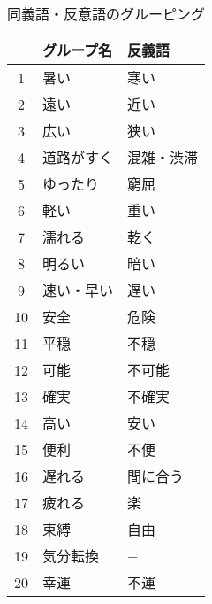 \documentclass[japanese]{jnlp_1.3a}
\begin{document}
\begin{table}[b]
  \caption{同義語・反意語のグルーピング}
  \begin{center}
    \begin{tabular}{|c|l|l|} \hline
          & グループ名     & 反義語     \\ \hline
       1  & 暑い           & 寒い       \\
       2  & 遠い           & 近い       \\
       3  & 広い           & 狭い       \\
       4  & 道路がすく     & 混雑・渋滞 \\
       5  & ゆったり       & 窮屈       \\
       6  & 軽い           & 重い       \\
       7  & 濡れる         & 乾く       \\
       8  & 明るい         & 暗い       \\
       9  & 速い・早い     & 遅い       \\
      10  & 安全           & 危険       \\
      11  & 平穏           & 不穏       \\
      12  & 可能           & 不可能     \\
      13  & 確実           & 不確実     \\
      14  & 高い           & 安い       \\
      15  & 便利           & 不便       \\
      16  & 遅れる         & 間に合う   \\
      17  & 疲れる         & 楽         \\
      18  & 束縛           & 自由       \\
      19  & 気分転換       & −         \\
      20  & 幸運           & 不運       \\ \hline
    \end{tabular}
    \label{tab:6_4}
  \end{center}
\end{table}
\end{document}
